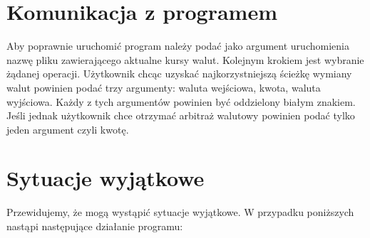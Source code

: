 ﻿\documentclass{article}
\begin{document}
\section{Komunikacja z programem}
Aby poprawnie uruchomić program należy podać jako argument uruchomienia nazwę pliku zawierającego aktualne kursy walut.
\newline\newline
Kolejnym krokiem jest wybranie żądanej operacji. Użytkownik chcąc uzyskać najkorzystniejszą ścieżkę wymiany walut powinien podać trzy argumenty: waluta wejściowa, kwota, waluta wyjściowa. Każdy z tych argumentów powinien być oddzielony białym znakiem. Jeśli jednak użytkownik chce otrzymać arbitraż walutowy powinien podać tylko jeden argument czyli kwotę.
\newline\newline



\section{Sytuacje wyjątkowe}
Przewidujemy, że mogą wystąpić sytuacje wyjątkowe. W przypadku poniższych
nastąpi następujące działanie programu:
\end{document}
